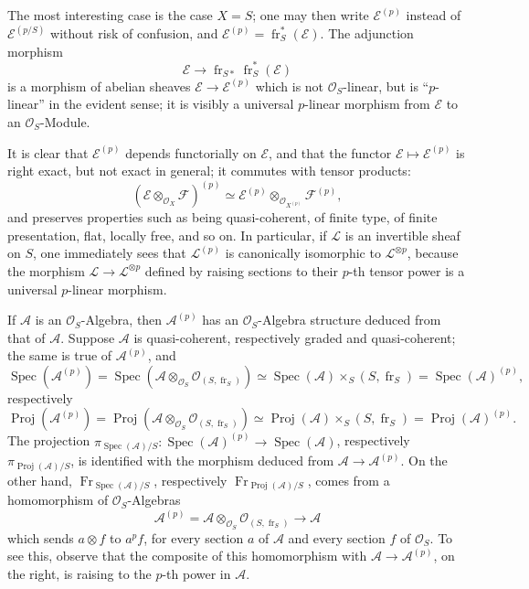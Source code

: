 \documentclass[11pt]{article}
\DeclareMathOperator{\Spec}{Spec}
\providecommand{\OO}{\mathcal{O}}
\providecommand{\cE}{\mathcal E}
\providecommand{\cF}{\mathcal F}
\providecommand{\Spec}{\operatorname{Spec}}
\providecommand{\Spec}{\operatorname{Spec}}
\providecommand{\Spec}{\operatorname{Spec}}
\providecommand{\fr}{\operatorname{fr}}
\providecommand{\Fr}{\operatorname{Fr}}
\providecommand{\Proj}{\operatorname{Proj}}
\providecommand{\cL}{\mathcal L}
\providecommand{\Fr}{\operatorname{Fr}}
\providecommand{\fr}{\operatorname{fr}}
\providecommand{\Spec}{\operatorname{Spec}}
\begin{document}
The most interesting case is the case $X=S$; one may then write $\cE^{(p)}$ instead of $\cE^{(p/S)}$ without risk of confusion, and $\cE^{(p)}=\fr_S^*(\cE)$. The adjunction morphism
\[
\cE\longrightarrow \fr_{S*}\fr_S^*(\cE)
\]
is a morphism of abelian sheaves $\cE\to\cE^{(p)}$ which is not $\OO_S$-linear, but is ``$p$-linear'' in the evident sense; it is visibly a universal $p$-linear morphism from $\cE$ to an $\OO_S$-Module.

It is clear that $\cE^{(p)}$ depends functorially on $\cE$, and that the functor $\cE\mapsto\cE^{(p)}$ is right exact, but not exact in general; it commutes with tensor products:
\[
(\cE\otimes_{\OO_X}\cF)^{(p)}\simeq
\cE^{(p)}\otimes_{\OO_{X^{(p)}}}\cF^{(p)},
\]
and preserves properties such as being quasi-coherent, of finite type, of finite presentation, flat, locally free, and so on. In particular, if $\cL$ is an invertible sheaf on $S$, one immediately sees that $\cL^{(p)}$ is canonically isomorphic to $\cL^{\otimes p}$, because the morphism $\cL\to\cL^{\otimes p}$ defined by raising sections to their $p$-th tensor power is a universal $p$-linear morphism.

If $\mathcal{A}$ is an $\OO_S$-Algebra, then $\mathcal{A}^{(p)}$ has an $\OO_S$-Algebra structure deduced from that of $\mathcal{A}$. Suppose $\mathcal{A}$ is quasi-coherent, respectively graded and quasi-coherent; the same is true of $\mathcal{A}^{(p)}$, and
\[
\Spec(\mathcal{A}^{(p)})=\Spec(\mathcal{A}\otimes_{\OO_S}\OO_{(S,\fr_S)})
 \simeq \Spec(\mathcal{A})\times_S(S,\fr_S)=\Spec(\mathcal{A})^{(p)},
\]
respectively
\[
\Proj(\mathcal{A}^{(p)})=\Proj(\mathcal{A}\otimes_{\OO_S}\OO_{(S,\fr_S)})
 \simeq \Proj(\mathcal{A})\times_S(S,\fr_S)=\Proj(\mathcal{A})^{(p)}.
\]
The projection $\pi_{\Spec(\mathcal{A})/S}:\Spec(\mathcal{A})^{(p)}\to\Spec(\mathcal{A})$, respectively $\pi_{\Proj(\mathcal{A})/S}$, is identified with the morphism deduced from $\mathcal{A}\to\mathcal{A}^{(p)}$. On the other hand, $\Fr_{\Spec(\mathcal{A})/S}$, respectively $\Fr_{\Proj(\mathcal{A})/S}$, comes from a homomorphism of $\OO_S$-Algebras
\[
\mathcal{A}^{(p)}=\mathcal{A}\otimes_{\OO_S}\OO_{(S,\fr_S)}\longrightarrow \mathcal{A}
\]
which sends $a\otimes f$ to $a^p f$, for every section $a$ of $\mathcal{A}$ and every section $f$ of $\OO_S$. To see this, observe that the composite of this homomorphism with $\mathcal{A}\to\mathcal{A}^{(p)}$, on the right, is raising to the $p$-th power in $\mathcal{A}$.
\end{document}

